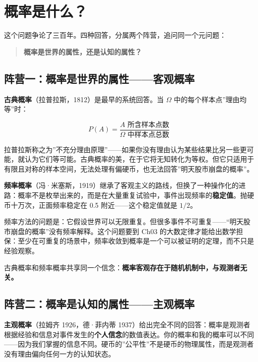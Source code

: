 \documentclass[
]{book}
\begin{document}
\section{概率是什么？}\label{ux6982ux7387ux662fux4ec0ux4e48}

这个问题争论了三百年。四种回答，分属两个阵营，追问同一个元问题：

\begin{quote}
\textbf{概率是世界的属性，还是认知的属性？}
\end{quote}

\subsection{阵营一：概率是世界的属性------客观概率}\label{ux9635ux8425ux4e00ux6982ux7387ux662fux4e16ux754cux7684ux5c5eux6027ux5ba2ux89c2ux6982ux7387}

\textbf{古典概率}（拉普拉斯，1812）是最早的系统回答。当 \(\Omega\) 中的每个样本点''理由均等''时：

\[P(A) = \frac{A \text{ 所含样本点数}}{\Omega \text{ 中样本点总数}}\]

拉普拉斯称之为''不充分理由原理''------如果你没有理由认为某些结果比另一些更可能，就认为它们等可能。古典概率的美，在于它将无知转化为等权。但它只适用于有限且对称的样本空间，无法处理有偏硬币，也无法回答''明天股市崩盘的概率''。

\textbf{频率概率}（冯·米塞斯，1919）继承了客观主义的路线，但换了一种操作化的进路：概率不是枚举出来的，而是在大量重复试验中，事件出现频率的\textbf{稳定值}。抛硬币十万次，正面频率稳定在 0.5 附近------这个稳定值就是 \(1/2\)。

频率方法的问题是：它假设世界可以无限重复。但很多事件不可重复------``明天股市崩盘的概率''没有频率解释。这个问题要到 Ch03 的大数定律才能给出数学担保：至少在可重复的场景中，频率收敛到概率是一个可以被证明的定理，而不只是经验观察。

古典概率和频率概率共享同一个信念：\textbf{概率客观存在于随机机制中，与观测者无关。}

\subsection{阵营二：概率是认知的属性------主观概率}\label{ux9635ux8425ux4e8cux6982ux7387ux662fux8ba4ux77e5ux7684ux5c5eux6027ux4e3bux89c2ux6982ux7387}

\textbf{主观概率}（拉姆齐 1926，德·菲内蒂 1937）给出完全不同的回答：概率是观测者根据经验和信息对事件发生的\textbf{个人信念}的数值表达。你的概率和我的概率可以不同------因为我们掌握的信息不同。硬币的''公平性''不是硬币的物理属性，而是观测者没有理由偏向任何一方的认知状态。
\end{document}
